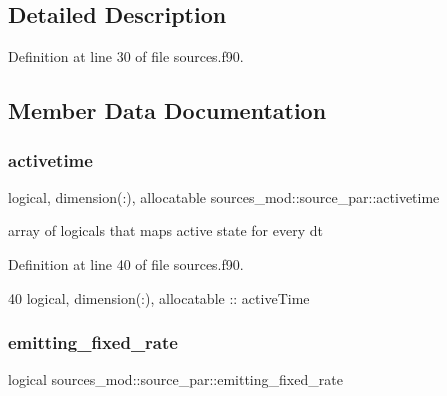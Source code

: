 \subsection{Detailed Description}


Definition at line 30 of file sources.\+f90.



\subsection{Member Data Documentation}
\mbox{\label{structsources__mod_1_1source__par_a0cae0e51885bfad3c4972923e198f22d}} 
\subsubsection{\texorpdfstring{activetime}{activetime}}
{\footnotesize\ttfamily logical, dimension(\+:), allocatable sources\+\_\+mod\+::source\+\_\+par\+::activetime\hspace{0.3cm}{\ttfamily [private]}}



array of logicals that maps active state for every dt 



Definition at line 40 of file sources.\+f90.


\begin{DoxyCode}
40         \textcolor{keywordtype}{logical}, \textcolor{keywordtype}{dimension(:)}, \textcolor{keywordtype}{allocatable} :: activeTime
\end{DoxyCode}
\mbox{\label{structsources__mod_1_1source__par_a957d4184d9cd997abeac05c04821139c}} 
\subsubsection{\texorpdfstring{emitting\+\_\+fixed\+\_\+rate}{emitting\_fixed\_rate}}
{\footnotesize\ttfamily logical sources\+\_\+mod\+::source\+\_\+par\+::emitting\+\_\+fixed\+\_\+rate\hspace{0.3cm}{\ttfamily [private]}}



